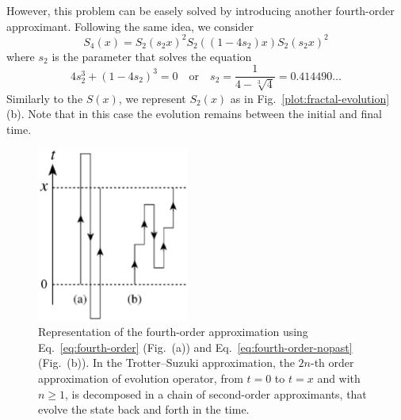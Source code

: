 However, this problem can be easely solved by introducing another fourth-order approximant. Following the same idea, we consider
\begin{equation} \label{eq:fourth-order-nopast}
S_4(x) = S_2(s_2x)^2 S_2((1-4s_2)x) S_2(s_2x)^2	
\end{equation}
where $s_2$ is the parameter that solves the equation
\begin{equation}
4s_2^3 + (1-4s_2)^3 = 0 \quad \mathrm{or} \quad s_2 = \frac{1}{4 - \sqrt[3]{4}}=0.414490\ldots
\end{equation}
Similarly to the $S(x)$, we represent $S_2(x)$ as in Fig.~\ref{plot:fractal-evolution}(b). Note that in this case the evolution remains between the initial and final time.
\begin{figure}[h!]
   \centering
   \includegraphics[width=5cm]{Plots/evolution.eps}
   \caption{Representation of the fourth-order approximation using Eq.~\eqref{eq:fourth-order} (Fig.~(a)) and Eq.~\eqref{eq:fourth-order-nopast} (Fig.~(b)). In the Trotter--Suzuki approximation, the $2n$-th order approximation of evolution operator, from $t=0$ to $t=x$ and with $n \geq 1 $, is decomposed in a chain of second-order approximants, that evolve the state back and forth in the time.} \label{plot:evolution}
\end{figure}


